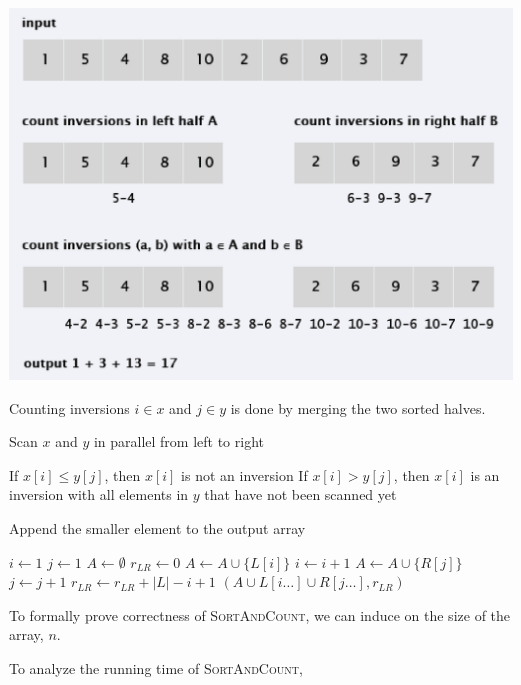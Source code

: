 \begin{center}
    \includegraphics[width=0.5\linewidth]{figures/counting-inversions.png}
\end{center}

Counting inversions $i \in x$ and $j \in y$ is done by merging the two sorted halves.

\begin{listu}
    \item Scan $x$ and $y$ in parallel from left to right
    \item If $x[i] \le y[j]$, then $x[i]$ is not an inversion
    If $x[i] > y[j]$, then $x[i]$ is an inversion with all elements in $y$ that have not been scanned yet
    \item Append the smaller element to the output array
\end{listu}

\begin{algorithm}
    \begin{algorithmic}[1]
            \State $i \gets 1$
            \State $j \gets 1$
            \State $A \gets \emptyset$
            \State $r_{LR} \gets 0$
                    \State $A \gets A \cup \{L[i]\}$
                    \State $i \gets i + 1$
                \Else
                    \State $A \gets A \cup \{R[j]\}$
                    \State $j \gets j + 1$
                    \State $r_{LR} \gets r_{LR} + |L| - i + 1$
                \EndIf
            \EndWhile
            \State \Return $(A \cup L[i \dots] \cup R[j \dots], r_{LR})$
        \EndFunction
    \end{algorithmic}
\end{algorithm}

To formally prove correctness of \textsc{SortAndCount}, we can induce on the size of the array, $n$. 

To analyze the running time of \textsc{SortAndCount}, 

